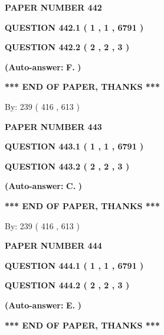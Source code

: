 \documentclass[12pt]{article}
\begin{document}
   
 {\textbf{ \Large{ PAPER NUMBER  442  }}}
   
   
   
   
  
  
{\textbf{\large{QUESTION
442.1 
 ( 1 , 1 , 6791 )
}}}
  
  
{\textbf{\large{QUESTION
442.2 
 ( 2 , 2 , 3 )
}}}
 
 
{\textbf{(Auto-answer:}}
{\textbf{\large{
F.}}}
{\textbf{)}}
 
 
   
   
   
   
\vspace{1.0in} 
{\textbf{\large{ *** END OF PAPER, THANKS *** }}} 
   
   
\hspace{1.0in} By: 
 239 ( 416 ,  613 )
   
   
   
   
\newpage 
\setcounter{page}{ 
   443001 } 
   
   
 {\textbf{ \Large{ PAPER NUMBER  443  }}}
   
   
   
   
  
  
{\textbf{\large{QUESTION
443.1 
 ( 1 , 1 , 6791 )
}}}
  
  
{\textbf{\large{QUESTION
443.2 
 ( 2 , 2 , 3 )
}}}
 
 
{\textbf{(Auto-answer:}}
{\textbf{\large{
C.}}}
{\textbf{)}}
 
 
   
   
   
   
\vspace{1.0in} 
{\textbf{\large{ *** END OF PAPER, THANKS *** }}} 
   
   
\hspace{1.0in} By: 
 239 ( 416 ,  613 )
   
   
   
   
\newpage 
\setcounter{page}{ 
   444001 } 
   
   
 {\textbf{ \Large{ PAPER NUMBER  444  }}}
   
   
   
   
  
  
{\textbf{\large{QUESTION
444.1 
 ( 1 , 1 , 6791 )
}}}
  
  
{\textbf{\large{QUESTION
444.2 
 ( 2 , 2 , 3 )
}}}
 
 
{\textbf{(Auto-answer:}}
{\textbf{\large{
E.}}}
{\textbf{)}}
 
 
   
   
   
   
\vspace{1.0in} 
{\textbf{\large{ *** END OF PAPER, THANKS *** }}} 
   
\end{document}
